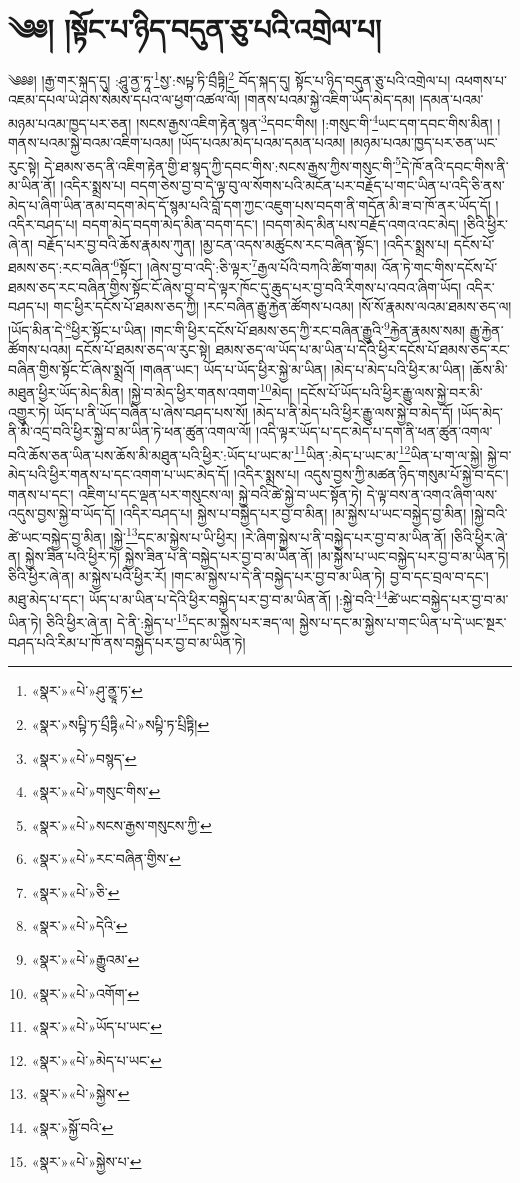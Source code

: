 \chapter{༄༅། །སྟོང་པ་ཉིད་བདུན་ཅུ་པའི་འགྲེལ་པ།}༄༅༅། །རྒྱ་གར་སྐད་དུ། :ཤཱུ་ནྱ་ཏཱ་\footnote{«སྣར་»«པེ་»ཤུ་ནྱཱ་ཏ་}སྱ་:སཔྟ་ཏི་བྲྀཏྟི།\footnote{«སྣར་»སཔྟི་ཏ་པྲྀཏྟི«པེ་»སཔྟི་ཏ་པྲིཏྟི།} བོད་སྐད་དུ། སྟོང་པ་ཉིད་བདུན་ཅུ་པའི་འགྲེལ་པ། འཕགས་པ་འཇམ་དཔལ་ཡེ་ཤེས་སེམས་དཔའ་ལ་ཕྱག་འཚལ་ལོ། །གནས་པའམ་སྐྱེ་འཇིག་ཡོད་མེད་དམ། །དམན་པའམ་མཉམ་པའམ་ཁྱད་པར་ཅན། །སངས་རྒྱས་འཇིག་རྟེན་སྙན་\footnote{«སྣར་»«པེ་»བསྙད་}དབང་གིས། །:གསུང་གི་\footnote{«སྣར་»«པེ་»གསུང་གིས་}ཡང་དག་དབང་གིས་མིན། །གནས་པའམ་སྐྱེ་བའམ་འཇིག་པའམ། །ཡོད་པའམ་མེད་པའམ་དམན་པའམ། །མཉམ་པའམ་ཁྱད་པར་ཅན་ཡང་རུང་སྟེ། དེ་ཐམས་ཅད་ནི་འཇིག་རྟེན་གྱི་ཐ་སྙད་ཀྱི་དབང་གིས་:སངས་རྒྱས་ཀྱིས་གསུང་གི་\footnote{«སྣར་»«པེ་»སངས་རྒྱས་གསུངས་ཀྱི་}དེ་ཁོ་ནའི་དབང་གིས་ནི་མ་ཡིན་ནོ། །འདིར་སྨྲས་པ། བདག་ཅེས་བྱ་བ་དེ་ལྟ་བུ་ལ་སོགས་པའི་མངོན་པར་བརྗོད་པ་གང་ཡིན་པ་འདི་ཅི་ནས་མེད་པ་ཞིག་ཡིན་ནམ་བདག་མེད་དོ་སྙམ་པའི་བློ་དག་ཀྱང་འཇུག་པས་བདག་ནི་གདོན་མི་ཟ་བ་ཁོ་ནར་ཡོད་དོ། །འདིར་བཤད་པ། བདག་མེད་བདག་མེད་མིན་བདག་དང་། །བདག་མེད་མིན་པས་བརྗོད་འགའ་འང་མེད། །ཅིའི་ཕྱིར་ཞེ་ན། བརྗོད་པར་བྱ་བའི་ཆོས་རྣམས་ཀུན། །མྱ་ངན་འདས་མཚུངས་རང་བཞིན་སྟོང་། །འདིར་སྨྲས་པ། དངོས་པོ་ཐམས་ཅད་:རང་བཞིན་\footnote{«སྣར་»«པེ་»རང་བཞིན་གྱིས་}སྟོང་། །ཞེས་བྱ་བ་འདི་:ཅི་ལྟར་\footnote{«སྣར་»«པེ་»ཅི་}རྒྱལ་པོའི་བཀའི་ཚིག་གམ། འོན་ཏེ་གང་གིས་དངོས་པོ་ཐམས་ཅད་རང་བཞིན་གྱིས་སྟོང་ངོ་ཞེས་བྱ་བ་དེ་ལྟར་ཁོང་དུ་ཆུད་པར་བྱ་བའི་རིགས་པ་འབའ་ཞིག་ཡོད། འདིར་བཤད་པ། གང་ཕྱིར་དངོས་པོ་ཐམས་ཅད་ཀྱི། །རང་བཞིན་རྒྱུ་རྐྱེན་ཚོགས་པའམ། །སོ་སོ་རྣམས་ལའམ་ཐམས་ཅད་ལ། །ཡོད་མིན་དེ་\footnote{«སྣར་»«པེ་»དེའི་}ཕྱིར་སྟོང་པ་ཡིན། །གང་གི་ཕྱིར་དངོས་པོ་ཐམས་ཅད་ཀྱི་རང་བཞིན་རྒྱུའི་\footnote{«སྣར་»«པེ་»རྒྱུའམ་}རྐྱེན་རྣམས་སམ། རྒྱུ་རྐྱེན་ཚོགས་པའམ། དངོས་པོ་ཐམས་ཅད་ལ་རུང་སྟེ། ཐམས་ཅད་ལ་ཡོད་པ་མ་ཡིན་པ་དེའི་ཕྱིར་དངོས་པོ་ཐམས་ཅད་རང་བཞིན་གྱིས་སྟོང་ངོ་ཞེས་སྨྲའོ། །གཞན་ཡང་། ཡོད་པ་ཡོད་ཕྱིར་སྐྱེ་མ་ཡིན། །མེད་པ་མེད་པའི་ཕྱིར་མ་ཡིན། །ཆོས་མི་མཐུན་ཕྱིར་ཡོད་མེད་མིན། །སྐྱེ་བ་མེད་ཕྱིར་གནས་འགག་\footnote{«སྣར་»«པེ་»འགོག་}མེད། །དངོས་པོ་ཡོད་པའི་ཕྱིར་རྒྱུ་ལས་སྐྱེ་བར་མི་འགྱུར་ཏེ། ཡོད་པ་ནི་ཡོད་བཞིན་པ་ཞེས་བཤད་པས་སོ། །མེད་པ་ནི་མེད་པའི་ཕྱིར་རྒྱུ་ལས་སྐྱེ་བ་མེད་དོ། །ཡོད་མེད་ནི་མི་འདྲ་བའི་ཕྱིར་སྐྱེ་བ་མ་ཡིན་ཏེ་ཕན་ཚུན་འགལ་ལོ། །འདི་ལྟར་ཡོད་པ་དང་མེད་པ་དག་ནི་ཕན་ཚུན་འགལ་བའི་ཆོས་ཅན་ཡིན་པས་ཆོས་མི་མཐུན་པའི་ཕྱིར་:ཡོད་པ་ཡང་མ་\footnote{«སྣར་»«པེ་»ཡོད་པ་ཡང་}ཡིན་:མེད་པ་ཡང་མ་\footnote{«སྣར་»«པེ་»མེད་པ་ཡང་}ཡིན་པ་ག་ལ་སྐྱེ། སྐྱེ་བ་མེད་པའི་ཕྱིར་གནས་པ་དང་འགག་པ་ཡང་མེད་དོ། །འདིར་སྨྲས་པ། འདུས་བྱས་ཀྱི་མཚན་ཉིད་གསུམ་པོ་སྐྱེ་བ་དང་། གནས་པ་དང་། འཇིག་པ་དང་ལྡན་པར་གསུངས་ལ། སྐྱེ་བའི་ཚེ་སྐྱེ་བ་ཡང་སྟོན་ཏེ། དེ་ལྟ་བས་ན་འགའ་ཞིག་ལས་འདུས་བྱས་སྐྱེ་བ་ཡོད་དོ། །འདིར་བཤད་པ། སྐྱེས་པ་བསྐྱེད་པར་བྱ་བ་མིན། །མ་སྐྱེས་པ་ཡང་བསྐྱེད་བྱ་མིན། །སྐྱེ་བའི་ཚེ་ཡང་བསྐྱེད་བྱ་མིན། །སྐྱེ་\footnote{«སྣར་»«པེ་»སྐྱེས་}དང་མ་སྐྱེས་པ་ཡི་ཕྱིར། །རེ་ཞིག་སྐྱེས་པ་ནི་བསྐྱེད་པར་བྱ་བ་མ་ཡིན་ནོ། །ཅིའི་ཕྱིར་ཞེ་ན། སྐྱེས་ཟིན་པའི་ཕྱིར་ཏེ། སྐྱེས་ཟིན་པ་ནི་བསྐྱེད་པར་བྱ་བ་མ་ཡིན་ནོ། །མ་སྐྱེས་པ་ཡང་བསྐྱེད་པར་བྱ་བ་མ་ཡིན་ཏེ། ཅིའི་ཕྱིར་ཞེ་ན། མ་སྐྱེས་པའི་ཕྱིར་རོ། །གང་མ་སྐྱེས་པ་དེ་ནི་བསྐྱེད་པར་བྱ་བ་མ་ཡིན་ཏེ། བྱ་བ་དང་བྲལ་བ་དང་། མཐུ་མེད་པ་དང་། ཡོད་པ་མ་ཡིན་པ་དེའི་ཕྱིར་བསྐྱེད་པར་བྱ་བ་མ་ཡིན་ནོ། །:སྐྱེ་བའི་\footnote{«སྣར་»སྐྱོ་བའི་}ཚེ་ཡང་བསྐྱེད་པར་བྱ་བ་མ་ཡིན་ཏེ། ཅིའི་ཕྱིར་ཞེ་ན། དེ་ནི་:སྐྱེད་པ་\footnote{«སྣར་»«པེ་»སྐྱེས་པ་}དང་མ་སྐྱེས་པར་ཟད་ལ། སྐྱེས་པ་དང་མ་སྐྱེས་པ་གང་ཡིན་པ་དེ་ཡང་སྔར་བཤད་པའི་རིམ་པ་ཁོ་ནས་བསྐྱེད་པར་བྱ་བ་མ་ཡིན་ཏེ། 